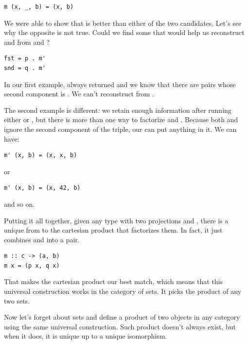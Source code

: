 \begin{Verbatim}[commandchars=\\\{\}]
m (x, _, b) = (x, b)
\end{Verbatim}
We were able to show that  is better than either of
the two candidates. Let's see why the opposite is not true. Could we
find some  that would help us reconstruct 
and  from  and ?

\begin{Verbatim}[commandchars=\\\{\}]
fst = p . m'
snd = q . m'
\end{Verbatim}
In our first example,  always returned  and we
know that there are pairs whose second component is . We
can't reconstruct  from .

The second example is different: we retain enough information after
running either  or , but there is more than one way
to factorize  and . Because both  and
 ignore the second component of the triple, our 
can put anything in it. We can have:

\begin{Verbatim}[commandchars=\\\{\}]
m' (x, b) = (x, x, b)
\end{Verbatim}
or

\begin{Verbatim}[commandchars=\\\{\}]
m' (x, b) = (x, 42, b)
\end{Verbatim}
and so on.

Putting it all together, given any type  with two projections
 and , there is a unique  from 
to the cartesian product  that factorizes them. In fact,
it just combines  and  into a pair.

\begin{Verbatim}[commandchars=\\\{\}]
m :: c -> (a, b)
m x = (p x, q x)
\end{Verbatim}
That makes the cartesian product  our best match, which
means that this universal construction works in the category of sets. It
picks the product of any two sets.

Now let's forget about sets and define a product of two objects in any
category using the same universal construction. Such product doesn't
always exist, but when it does, it is unique up to a unique isomorphism.

